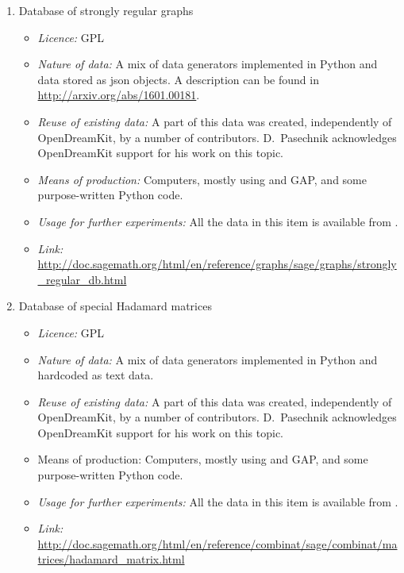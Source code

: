 \documentclass{../../Proposal/LaTeX-proposal/deliverablereport}
\begin{document}
\begin{description}
\begin{enumerate}
\begin{itemize}
\end{itemize}


\item{Database of strongly regular graphs}
\begin{itemize}
\item\textit{Licence:}  GPL
\item\textit{Nature of data:} A mix of data generators implemented in Python and
data stored as json objects. A description can be found in \href{http://arxiv.org/abs/1601.00181}{http://arxiv.org/abs/1601.00181}.
\item\textit{Reuse of existing data:} A part of this data was created,
  independently of OpenDreamKit, by a number of \Sage contributors.
D.~Pasechnik acknowledges OpenDreamKit support for his work on this topic.
\item\textit{Means of production:} Computers, mostly using \Sage and GAP, and some purpose-written
Python code.
\item\textit{Usage for further experiments:} All the data  in this item is available from \Sage.
\item\textit{Link:} \url{http://doc.sagemath.org/html/en/reference/graphs/sage/graphs/strongly_regular_db.html}
\end{itemize}


\item{Database of special Hadamard matrices}
\begin{itemize}
\item\textit{Licence:} GPL
\item\textit{Nature of data:} A mix of data generators implemented in Python and hardcoded as text data.
\item\textit{Reuse of existing data:} A part of this data was created, independently of OpenDreamKit, by
a number of \Sage contributors.
D.~Pasechnik acknowledges OpenDreamKit support for his work on this topic.
\item{Means of production:} Computers, mostly using \Sage and GAP, and some purpose-written
Python code.
\item\textit{Usage for further experiments:} All the data  in this item is available from \Sage.
\item\textit{Link:} \url{http://doc.sagemath.org/html/en/reference/combinat/sage/combinat/matrices/hadamard_matrix.html}
\end{itemize}
\end{enumerate}
\end{description}
\end{document}
